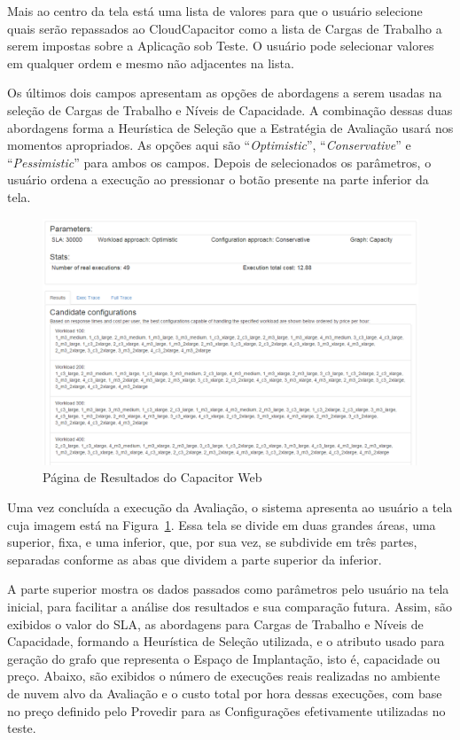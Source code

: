Mais ao centro da tela está uma lista de valores para que o usuário selecione quais 
serão repassados ao CloudCapacitor como a lista de Cargas de Trabalho a serem impostas
sobre a Aplicação sob Teste. O usuário pode selecionar valores em qualquer ordem e mesmo
não adjacentes na lista.

Os últimos dois campos apresentam as opções de abordagens a serem usadas na seleção de
Cargas de Trabalho e Níveis de Capacidade. A combinação dessas duas abordagens forma a
Heurística de Seleção que a Estratégia de Avaliação usará nos momentos apropriados. As 
opções aqui são ``\emph{Optimistic}'', ``\emph{Conservative}'' e ``\emph{Pessimistic}''
para ambos os campos. Depois de selecionados os parâmetros, o usuário ordena a execução 
ao pressionar o botão presente na parte inferior da tela.

\begin{figure}[htb]
  \caption{\label{fig:capacitor_web_results}Página de Resultados do Capacitor Web}
  \begin{center}
    \includegraphics[scale=0.5]{img/CapacitorWeb_Results}
  \end{center}
\end{figure}

Uma vez concluída a execução da Avaliação, o sistema apresenta ao usuário a tela
cuja imagem está na Figura~\ref{fig:capacitor_web_results}. Essa tela se divide
em duas grandes áreas, uma superior, fixa, e uma inferior, que, por sua vez, 
se subdivide em três partes, separadas conforme as abas que dividem a parte 
superior da inferior.

A parte superior mostra os dados passados como parâmetros pelo usuário na tela
inicial, para facilitar a análise dos resultados e sua comparação futura. Assim,
são exibidos o valor do SLA, as abordagens para Cargas de Trabalho e Níveis de 
Capacidade, formando a Heurística de Seleção utilizada, e o atributo usado para
geração do grafo que representa o Espaço de Implantação, isto é, capacidade ou
preço. Abaixo, são exibidos o número de execuções reais realizadas no ambiente
de nuvem alvo da Avaliação e o custo total por hora dessas execuções, com base
no preço definido pelo Provedir para as Configurações efetivamente utilizadas no 
teste. 
 
